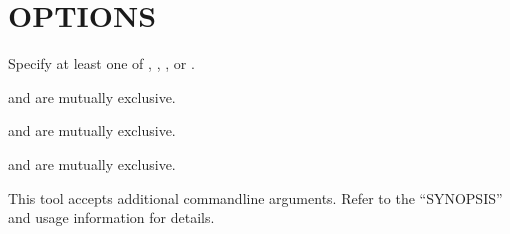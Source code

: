 \documentclass[letterpaper,10pt,english]{sphinxmanual}
\begin{document}
\section{OPTIONS}
\label{\detokenize{mariadb-kill:options}}
\sphinxAtStartPar
Specify at least one of {\hyperref[\detokenize{mariadb-kill:cmdoption-mariadb-kill-kill}]{}}, {\hyperref[\detokenize{mariadb-kill:cmdoption-mariadb-kill-kill-query}]{}}, {\hyperref[\detokenize{mariadb-kill:cmdoption-mariadb-kill-print}]{}}, {\hyperref[\detokenize{mariadb-kill:cmdoption-mariadb-kill-execute-command}]{}} or {\hyperref[\detokenize{mariadb-kill:cmdoption-mariadb-kill-stop}]{}}.

\sphinxAtStartPar
{\hyperref[\detokenize{mariadb-kill:cmdoption-mariadb-kill-any-busy-time}]{}} and {\hyperref[\detokenize{mariadb-kill:cmdoption-mariadb-kill-each-busy-time}]{}} are mutually exclusive.

\sphinxAtStartPar
{\hyperref[\detokenize{mariadb-kill:cmdoption-mariadb-kill-kill}]{}} and {\hyperref[\detokenize{mariadb-kill:cmdoption-mariadb-kill-kill-query}]{}} are mutually exclusive.

\sphinxAtStartPar
{\hyperref[\detokenize{mariadb-kill:cmdoption-mariadb-kill-daemonize}]{}} and {\hyperref[\detokenize{mariadb-kill:cmdoption-mariadb-kill-test-matching}]{}} are mutually exclusive.

\sphinxAtStartPar
This tool accepts additional command\sphinxhyphen{}line arguments.  Refer to the
“SYNOPSIS” and usage information for details.
\end{document}
